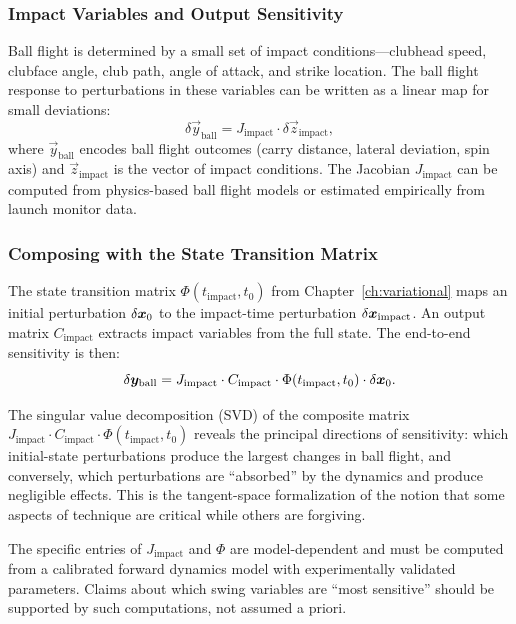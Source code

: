 \subsubsection{Impact Variables and Output Sensitivity}

Ball flight is determined by a small set of impact conditions---clubhead speed,
clubface angle, club path, angle of attack, and strike location. The ball flight
response to perturbations in these variables can be written as a linear map for
small deviations:
\begin{equation}
\delta\vec{y}_{\text{ball}} = J_{\text{impact}} \cdot \delta\vec{z}_{\text{impact}},
\label{eq:ch8:impact-sensitivity}
\end{equation}
where $\vec{y}_{\text{ball}}$ encodes ball flight outcomes (carry distance, lateral
deviation, spin axis) and $\vec{z}_{\text{impact}}$ is the vector of impact conditions.
The Jacobian $J_{\text{impact}}$ can be computed from physics-based ball flight models
or estimated empirically from launch monitor data.

\subsubsection{Composing with the State Transition Matrix}

The state transition matrix $\Phi(t_{\text{impact}}, t_0)$ from
Chapter~\ref{ch:variational} maps an initial perturbation $\delta\bm{x}_0$ to the
impact-time perturbation $\delta\bm{x}_{\text{impact}}$. An output matrix
$C_{\text{impact}}$ extracts impact variables from the full state. The end-to-end
sensitivity is then:
\begin{equation}
\delta\bm{y}_{\text{ball}} = J_{\text{impact}} \cdot C_{\text{impact}} \cdot
\Phi(t_{\text{impact}}, t_0) \cdot \delta\bm{x}_0.
\label{eq:ch8:full-sensitivity}
\end{equation}

The singular value decomposition (SVD) of the composite matrix
$J_{\text{impact}} \cdot C_{\text{impact}} \cdot \Phi(t_{\text{impact}}, t_0)$
reveals the principal directions of sensitivity: which initial-state perturbations
produce the largest changes in ball flight, and conversely, which perturbations
are ``absorbed'' by the dynamics and produce negligible effects. This is the
tangent-space formalization of the notion that some aspects of technique are
critical while others are forgiving.

\begin{warningbox}
The specific entries of $J_{\text{impact}}$ and $\Phi$ are model-dependent and
must be computed from a calibrated forward dynamics model with experimentally
validated parameters. Claims about which swing variables are ``most sensitive''
should be supported by such computations, not assumed a priori.
\end{warningbox}

